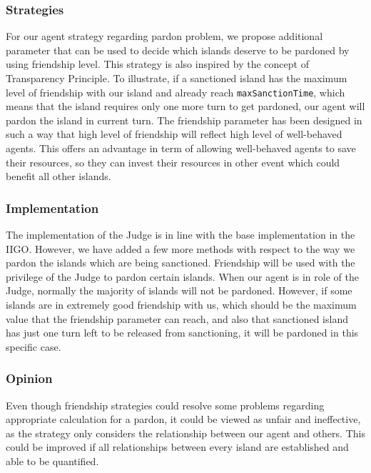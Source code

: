 \subsubsection{Strategies} \label{subsubsec:Team6_Judge:Strategies}
For our agent strategy regarding pardon problem, we propose additional parameter that can be used to decide which islands deserve to be pardoned by using friendship level. This strategy is also inspired by the concept of Transparency Principle. To illustrate, if a sanctioned island has the maximum level of friendship with our island and already reach \texttt{maxSanctionTime}, which means that the island requires only one more turn to get pardoned, our agent will pardon the island in current turn. The friendship parameter has been designed in such a way that high level of friendship will reflect high level of well-behaved agents. This offers an advantage in term of allowing well-behaved agents to save their resources, so they can invest their resources in other event which could benefit all other islands.

\subsubsection{Implementation} \label{subsubsec:Team6_Judge:Implementation}
The implementation of the Judge is in line with the base implementation in the IIGO. However, we have added a few more methods with respect to the way we pardon the islands which are being sanctioned. Friendship will be used with the privilege of the Judge to pardon certain islands. When our agent is in role of the Judge, normally the majority of islands will not be pardoned. However, if some islands are in extremely good friendship with us, which should be the maximum value that the friendship parameter can reach, and also that sanctioned island has just one turn left to be released from sanctioning, it will be pardoned in this specific case.

\subsubsection{Opinion} \label{subsubsec:Team6_Judge:Opinion}
Even though friendship strategies could resolve some problems regarding appropriate calculation for a pardon, it could be viewed as unfair and ineffective, as the strategy only considers the relationship between our agent and others. This could be improved if all relationships between every island are established and able to be quantified.

